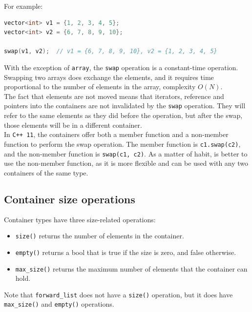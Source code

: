 For example:\\

\begin{lstlisting}[language=C++]
vector<int> v1 = {1, 2, 3, 4, 5};
vector<int> v2 = {6, 7, 8, 9, 10};

swap(v1, v2);  // v1 = {6, 7, 8, 9, 10}, v2 = {1, 2, 3, 4, 5}
\end{lstlisting}

With the exception of \texttt{array}, the \texttt{swap} operation is a constant-time operation.
Swapping two arrays does exchange the elements, and it requires time proportional to the number
of elements in the array, complexity $O(N)$.\\

The fact that elements are not moved means that iterators, reference and pointers into the 
containers are not invalidated by the \texttt{swap} operation. They will refer to the same
elements as they did before the operation, but after the swap, those elements will be in a
different container.\\

In \texttt{C++ 11}, the containers offer both a member function and a non-member function to
perform the swap operation. The member function is \texttt{c1.swap(c2)}, and the non-member
function is \texttt{swap(c1, c2)}. As a matter of habit, is better to use the non-member
function, as it is more flexible and can be used with any two containers of the same type.

\subsection{Container size operations}

Container types have three size-related operations:

\begin{itemize}
    \item \texttt{size()} returns the number of elements in the container.
    \item \texttt{empty()} returns a bool that is true if the size is zero, and false otherwise.
    \item \texttt{max\_size()} returns the maximum number of elements that the container can hold.
\end{itemize}

Note that \texttt{forward\_list} does not have a \texttt{size()} operation, but it does have
\texttt{max\_size()} and \texttt{empty()} operations.

